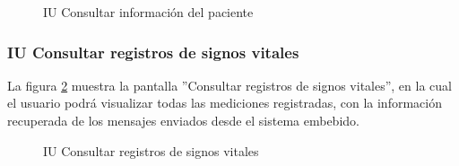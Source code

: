 \begin{figure}[htpb!]
	\begin{center}
		\caption{IU Consultar información del paciente \label{fig:casosUso:resumenUI4}}
	\end{center}
\end{figure}


\subsubsection{IU Consultar registros de signos vitales}
La figura \ref{fig:casosUso:resumenUI5} muestra la pantalla ''Consultar registros de signos vitales'', en la cual el usuario podrá visualizar todas las mediciones registradas, con la información recuperada de los mensajes enviados desde el sistema embebido.

\begin{figure}[htpb!]
	\begin{center}
		\caption{IU Consultar registros de signos vitales\label{fig:casosUso:resumenUI5}}
	\end{center}
\end{figure}
